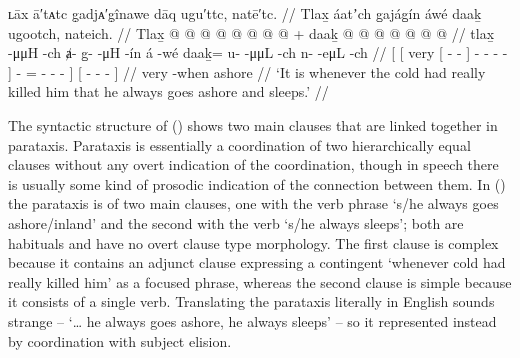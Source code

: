 \ex\label{ex:93-9-cold-killed}%
%
\begingl
	\glpreamble	ʟāx ā′tᴀtc g̣adjᴀ′g̣înawe dāq ugu′ttc, natē′tc. //
	\glpreamble	Tlax̱ áatʼch g̱ajág̱ín áwé daaḵ ugootch, nateich. //
	\gla	{} {} Tlax̱ {}  @ {} @ {} {}
				 @ {} @ {} @ {} @ {} @ {} {}  @ {} +
			daaḵ @  @ {} @ {} @ {} {} 
		{}  @ {} @ {} @ {} {} //
	\glb	{} {} tlax̱ {}  -μμH -ch {}
				ⱥ- {} g̱-  -μH -ín {} á -wé
			daaḵ= u-  -μμL -ch {}
		{} n-  -eμL -ch {} //
	\glc	{}[\pr{CP} [ very {}[  - - {}]
				- \· -  - - {}]  -
			= -  - - {}]
		{}[ -  - - {}] //
	\gld	{} {} very {}  {} {} {}
				 {} {} {} {} -when {}  {}
			ashore  {} {} {} {}
		{}  {} {} {} {} //
	\glft	‘It is whenever the cold had really killed him that he always goes ashore and sleeps.’
		//
\endgl
\xe

The syntactic structure of (\lastx) shows two main clauses that are linked together in parataxis.
Parataxis is essentially a coordination of two hierarchically equal clauses without any overt indication of the coordination, though in speech there is usually some kind of prosodic indication of the connection between them.
In (\lastx) the parataxis is of two main clauses, one with the verb phrase  ‘s/he always goes ashore/inland’ and the second with the verb  ‘s/he always sleeps’; both are habituals and have no overt clause type morphology.
The first clause is complex because it contains an adjunct clause  expressing a contingent ‘whenever cold had really killed him’ as a focused phrase, whereas the second clause is simple because it consists of a single verb.
Translating the parataxis literally in English sounds strange – ‘… he always goes ashore, he always sleeps’ – so it represented instead by coordination with subject elision.

